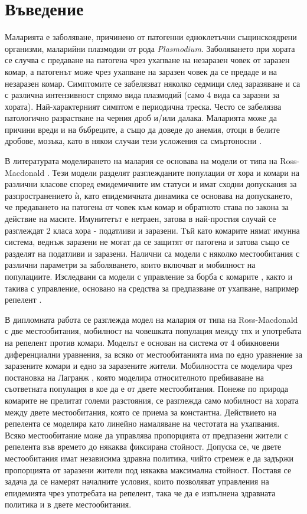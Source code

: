 \section{\hspace{1em} Въведение}
Маларията е заболяване, причинено от патогенни едноклетъчни същинскоядрени организми, маларийни плазмодии от рода \textit{Plasmodium}.
Заболяването при хората се случва с предаване на патогена чрез ухапване на незаразен човек от заразен комар, а патогенът може чрез ухапване на заразен човек да се предаде и на незаразен комар.
Симптомите се забелязват няколко седмици след заразяване и са с различна интензивност спрямо вида плазмодий (само 4 вида са заразни за хората).
Най-характерният симптом е периодична треска. Често се забелязва патологично разрастване на черния дроб и/или далака.
Маларията може да причини вреди и на бъбреците, а също да доведе до анемия, отоци в белите дробове, мозъка, като в някои случаи тези усложения са смъртоносни \cite[глава~83]{Baron1996}.

В литературата моделирането на малария се основава на модели от типа на Ross-Macdonald \cite{Smith2012}.
Тези модели разделят разглежданите популации от хора и комари на различни класове според емидемичните им статуси и имат сходни допускания за разпространението ѝ, като епидемичната динамика се основава на допускането, че предаването на патогена от човек към комар и обратното става по закона за действие на масите.
Имунитетът е нетраен, затова в най-простия случай се разглеждат 2 класа хора - податливи и заразени.
Тъй като комарите нямат имунна система, веднъж заразени не могат да се защитят от патогена и затова също се разделят на податливи и заразени.
Налични са модели \cite{Cosner2009, Ruktanonchai2016, Bichara2016, Agusto2021, Prosper2012} с няколко местообитания с различни параметри за заболяването, които включват и мобилност на популациите.
Изследвани са модели с управление за борба с комарите \cite{DeLara2016}, както и такива с управление, основано на средства за предпазване от ухапване, например репелент \cite{Rashkov2022, Rashkov2021}.

В дипломната работа се разглежда модел на малария от типа на Ross-Macdonald с две местообитания, мобилност на човешката популация между тях и употребата на репелент против комари.
Моделът е основан на система от 4 обикновени диференциални уравнения, за всяко от местообитанията има по едно уравнение за заразените комари и едно за заразените жители.
Мобилността се моделира чрез постановка на Лагранж \cite{Cosner2009}, която моделира относителното пребиваване на съответната популация в кое да е от двете местообитания.
Понеже по природа комарите не прелитат големи разстояния, се разглежда само мобилност на хората между двете местообитания, която се приема за константна.
Действието на репелента се моделира като линейно намаляване на честотата на ухапвания.
Всяко местообитание може да управлява пропорцията от предпазени жители с репелента във времето до някаква фиксирана стойност.
Допуска се, че двете местообитания имат независима здравна политика, чийто стремеж е да задържи пропорцията от заразени жители под някаква максимална стойност.
Поставя се задача да се намерят началните условия, които позволяват управления на епидемията чрез употребата на репелент, така че да е изпълнена здравната политика и в двете местообитания.
